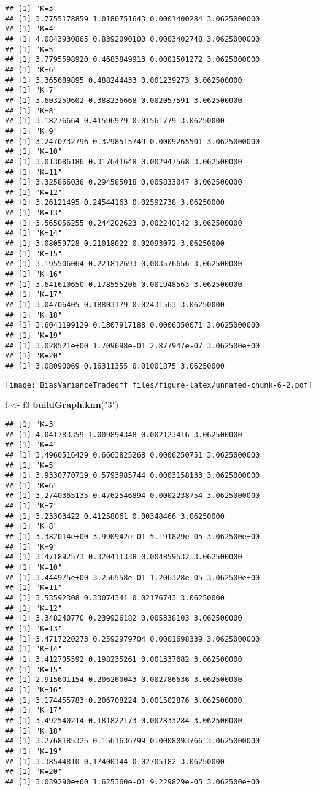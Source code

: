 \documentclass[]{article}
\newenvironment{Shaded}{\begin{snugshade}}{\end{snugshade}}
\newcommand{\KeywordTok}[1]{\textcolor[rgb]{0.13,0.29,0.53}{\textbf{#1}}}
\newcommand{\NormalTok}[1]{#1}
\newcommand{\StringTok}[1]{\textcolor[rgb]{0.31,0.60,0.02}{#1}}
\begin{document}
\begin{verbatim}
## [1] "K=3"
## [1] 3.7755178859 1.0180751643 0.0001400284 3.0625000000
## [1] "K=4"
## [1] 4.0843930865 0.8392090100 0.0003402748 3.0625000000
## [1] "K=5"
## [1] 3.7795598920 0.4683849913 0.0001501272 3.0625000000
## [1] "K=6"
## [1] 3.365689895 0.488244433 0.001239273 3.062500000
## [1] "K=7"
## [1] 3.603259602 0.388236668 0.002057591 3.062500000
## [1] "K=8"
## [1] 3.18276664 0.41596979 0.01561779 3.06250000
## [1] "K=9"
## [1] 3.2470732796 0.3298515749 0.0009265501 3.0625000000
## [1] "K=10"
## [1] 3.013086186 0.317641648 0.002947568 3.062500000
## [1] "K=11"
## [1] 3.325866036 0.294585018 0.005833047 3.062500000
## [1] "K=12"
## [1] 3.26121495 0.24544163 0.02592738 3.06250000
## [1] "K=13"
## [1] 3.565056255 0.244202623 0.002240142 3.062500000
## [1] "K=14"
## [1] 3.08059728 0.21018022 0.02093072 3.06250000
## [1] "K=15"
## [1] 3.195506064 0.221812693 0.003576656 3.062500000
## [1] "K=16"
## [1] 3.641610650 0.178555206 0.001948563 3.062500000
## [1] "K=17"
## [1] 3.04706405 0.18803179 0.02431563 3.06250000
## [1] "K=18"
## [1] 3.6041199129 0.1807917188 0.0006350071 3.0625000000
## [1] "K=19"
## [1] 3.028521e+00 1.709698e-01 2.877947e-07 3.062500e+00
## [1] "K=20"
## [1] 3.08090069 0.16311355 0.01001875 3.06250000
\end{verbatim}

\texttt{[image: BiasVarianceTradeoff\_files/figure-latex/unnamed-chunk-6-2.pdf]}

\begin{Shaded}
\begin{Highlighting}[]
\NormalTok{f <-}\StringTok{ }\NormalTok{f3}
\KeywordTok{buildGraph.knn}\NormalTok{(}\StringTok{"3"}\NormalTok{)}
\end{Highlighting}
\end{Shaded}

\begin{verbatim}
## [1] "K=3"
## [1] 4.041783359 1.009894348 0.002123416 3.062500000
## [1] "K=4"
## [1] 3.4960516429 0.6663825268 0.0006250751 3.0625000000
## [1] "K=5"
## [1] 3.9330770719 0.5793985744 0.0003158133 3.0625000000
## [1] "K=6"
## [1] 3.2740365135 0.4762546894 0.0002238754 3.0625000000
## [1] "K=7"
## [1] 3.23303422 0.41258061 0.00348466 3.06250000
## [1] "K=8"
## [1] 3.382014e+00 3.990942e-01 5.191829e-05 3.062500e+00
## [1] "K=9"
## [1] 3.471892573 0.320411338 0.004859532 3.062500000
## [1] "K=10"
## [1] 3.444975e+00 3.256558e-01 1.206328e-05 3.062500e+00
## [1] "K=11"
## [1] 3.53592308 0.33074341 0.02176743 3.06250000
## [1] "K=12"
## [1] 3.348240770 0.239926182 0.005338103 3.062500000
## [1] "K=13"
## [1] 3.4717220273 0.2592979704 0.0001698339 3.0625000000
## [1] "K=14"
## [1] 3.412705592 0.198235261 0.001337682 3.062500000
## [1] "K=15"
## [1] 2.915601154 0.206260043 0.002786636 3.062500000
## [1] "K=16"
## [1] 3.174455783 0.206708224 0.001502876 3.062500000
## [1] "K=17"
## [1] 3.492540214 0.181822173 0.002833284 3.062500000
## [1] "K=18"
## [1] 3.2768185325 0.1561636799 0.0008093766 3.0625000000
## [1] "K=19"
## [1] 3.38544810 0.17400144 0.02705182 3.06250000
## [1] "K=20"
## [1] 3.039290e+00 1.625360e-01 9.229829e-05 3.062500e+00
\end{verbatim}
\end{document}
